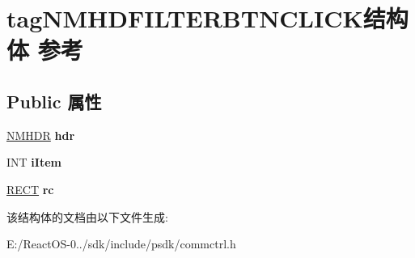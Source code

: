 \hypertarget{structtag_n_m_h_d_f_i_l_t_e_r_b_t_n_c_l_i_c_k}{}\section{tag\+N\+M\+H\+D\+F\+I\+L\+T\+E\+R\+B\+T\+N\+C\+L\+I\+C\+K结构体 参考}
\label{structtag_n_m_h_d_f_i_l_t_e_r_b_t_n_c_l_i_c_k}
\subsection*{Public 属性}
\begin{DoxyCompactItemize}
\item 
\mbox{\label{structtag_n_m_h_d_f_i_l_t_e_r_b_t_n_c_l_i_c_k_a0615906492870a3be7e317095cefe6b3}} 
\hyperlink{structtag_n_m_h_d_r}{N\+M\+H\+DR} {\bfseries hdr}
\item 
\mbox{\label{structtag_n_m_h_d_f_i_l_t_e_r_b_t_n_c_l_i_c_k_a06d48b594950a7d60a7c35ab536cbe5b}} 
I\+NT {\bfseries i\+Item}
\item 
\mbox{\label{structtag_n_m_h_d_f_i_l_t_e_r_b_t_n_c_l_i_c_k_ac5dab934e3129b2d3539f68f99fe2e02}} 
\hyperlink{structtag_r_e_c_t}{R\+E\+CT} {\bfseries rc}
\end{DoxyCompactItemize}


该结构体的文档由以下文件生成\+:\begin{DoxyCompactItemize}
\item 
E\+:/\+React\+O\+S-\/0../sdk/include/psdk/commctrl.\+h\end{DoxyCompactItemize}
